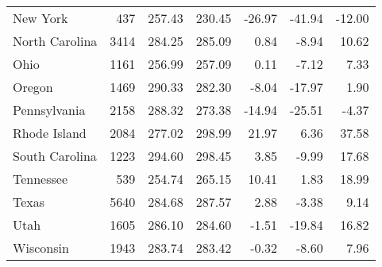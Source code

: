 \begin{table}[ht]
\begin{center}
\begin{tabular}{lrrrrrr}
  New York & 437 & 257.43 & 230.45 & -26.97 & -41.94 & -12.00 \\ 
  North Carolina & 3414 & 284.25 & 285.09 & 0.84 & -8.94 & 10.62 \\ 
  Ohio & 1161 & 256.99 & 257.09 & 0.11 & -7.12 & 7.33 \\ 
  Oregon & 1469 & 290.33 & 282.30 & -8.04 & -17.97 & 1.90 \\ 
  Pennsylvania & 2158 & 288.32 & 273.38 & -14.94 & -25.51 & -4.37 \\ 
  Rhode Island & 2084 & 277.02 & 298.99 & 21.97 & 6.36 & 37.58 \\ 
  South Carolina & 1223 & 294.60 & 298.45 & 3.85 & -9.99 & 17.68 \\ 
  Tennessee & 539 & 254.74 & 265.15 & 10.41 & 1.83 & 18.99 \\ 
  Texas & 5640 & 284.68 & 287.57 & 2.88 & -3.38 & 9.14 \\ 
  Utah & 1605 & 286.10 & 284.60 & -1.51 & -19.84 & 16.82 \\ 
  Wisconsin & 1943 & 283.74 & 283.42 & -0.32 & -8.60 & 7.96 \\ 
   \hline
\end{tabular}
\end{center}
\end{table}

